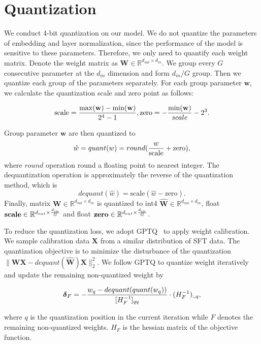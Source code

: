 
\section{Quantization}
\label{app:quantization}
We conduct 4-bit quantization on our model. We do not quantize the parameters of embedding and layer normalization, since the performance of the model is sensitive to these parameters. Therefore, we only need to quantify each weight matrix. Denote the weight matrix as $\mathbf{W}\in \mathbb{R}^{d_{out}\times d_{in}}$. We group every $G$ consecutive parameter at the $d_{in}$ dimension and form $d_{in}/G$ group. Then we quantize each group of the parameters separately. For each group parameter $\mathbf{w}$, we calculate the quantization scale and zero point as follows:

$$
\text{scale}= {\max(\mathbf{w}) - \min(\mathbf{w}) \over {2^4-1}}, \text{zero} = - {\min(\mathbf{w}) \over scale} - 2^3.
$$

Group parameter $\mathbf{w}$ are then quantized to $$\hat w = quant(w) = round({w\over \text{scale}}+\text{zero}),$$ where $round$ operation round a floating point to nearest integer. The dequantization operation is approximately the reverse of the quantization method, which is $$dequant(\hat w) = \text{scale}(\hat w - \text{zero}).$$ Finally, matrix $\mathbf{W}\in \mathbb{R}^{d_{out}\times d_{in}}$ is quantized to int4 $\mathbf{\hat{W}}\in \mathbb{R}^{d_{out}\times d_{in}}$, float $\textbf{scale}\in \mathbb{R}^{d_{out}\times {d_{in}\over G}}$ and float $\textbf{zero}\in \mathbb{R}^{d_{out}\times {d_{in}\over G}}$.


To reduce the quantization loss, we adopt GPTQ~\citep{DBLP:journals/corr/abs-2210-17323} to apply weight calibration.
We sample calibration data $\mathbf{X}$ from a similar distribution of SFT data. 
The quantization objective is to minimize the disturbance of the quantization $\|\mathbf{W}\mathbf{X}-dequant(\mathbf{\hat W})\mathbf{X}\|_2^2$.
We follow GPTQ to quantize weight iteratively and update the remaining non-quantized weight by

$$
\boldsymbol{\delta}_F = - {w_q-dequant(quant(w_q)) \over [H^{-1}_F]_{qq}} \cdot (H_F^{-1})_{:,q},
$$

where $q$ is the quantization position in the current iteration while $F$ denotes the remaining non-quantized weights. $H_F$ is the hessian matrix of the objective function.
